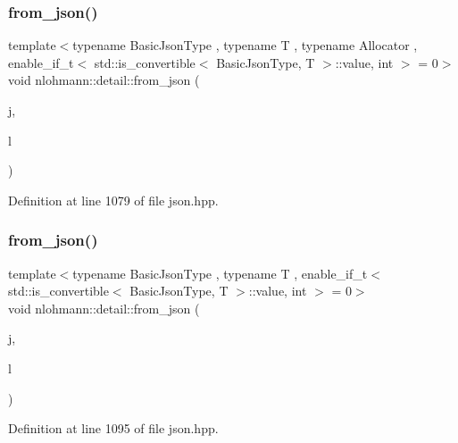 \subsubsection{\texorpdfstring{from\+\_\+json()}{from\_json()}\hspace{0.1cm}{\footnotesize\ttfamily [10/18]}}
{\footnotesize\ttfamily template$<$typename Basic\+Json\+Type , typename T , typename Allocator , enable\+\_\+if\+\_\+t$<$ std\+::is\+\_\+convertible$<$ Basic\+Json\+Type, T $>$\+::value, int $>$  = 0$>$ \\
void nlohmann\+::detail\+::from\+\_\+json (\begin{DoxyParamCaption}\item[{const Basic\+Json\+Type \&}]{j,  }\item[{std\+::forward\+\_\+list$<$ T, Allocator $>$ \&}]{l }\end{DoxyParamCaption})}



Definition at line 1079 of file json.\+hpp.

\mbox{\label{namespacenlohmann_1_1detail_a3df497b1d3977f071b488ecac1401517}} 
\subsubsection{\texorpdfstring{from\+\_\+json()}{from\_json()}\hspace{0.1cm}{\footnotesize\ttfamily [11/18]}}
{\footnotesize\ttfamily template$<$typename Basic\+Json\+Type , typename T , enable\+\_\+if\+\_\+t$<$ std\+::is\+\_\+convertible$<$ Basic\+Json\+Type, T $>$\+::value, int $>$  = 0$>$ \\
void nlohmann\+::detail\+::from\+\_\+json (\begin{DoxyParamCaption}\item[{const Basic\+Json\+Type \&}]{j,  }\item[{std\+::valarray$<$ T $>$ \&}]{l }\end{DoxyParamCaption})}



Definition at line 1095 of file json.\+hpp.

\mbox{\label{namespacenlohmann_1_1detail_a8dcac00852dbe1f61d1e78135b19d428}} 
